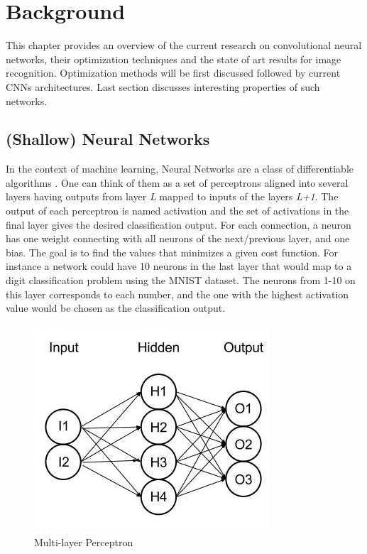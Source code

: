 \chapter{Background}

This chapter provides an overview of the current research on convolutional neural networks, their optimization techniques and the state of art results for image recognition. Optimization methods will be first discussed followed by current CNNs architectures. Last section discusses interesting properties of such networks.

\section{ (Shallow) Neural Networks}

In the context of machine learning, Neural Networks are a class of differentiable algorithms \cite{bishop1995neural}. One can think of them as a set of perceptrons aligned into several layers having outputs from layer \textit{L} mapped to inputs of the layers \textit{L+1}. The output of each perceptron is named activation and the set of activations in the final layer gives the desired classification output. For each connection, a neuron has one weight connecting with all neurons of the next/previous layer, and one bias. The goal is to find the values that minimizes a given cost function. For instance a network could have 10 neurons in the last layer that would map to a digit classification problem using the MNIST \cite{lecun1998mnist} dataset. The neurons from 1-10 on this layer corresponds to each number, and the one with the highest activation value would be chosen as the classification output.

\begin{figure}[h!]
	\centering
	\includegraphics[scale=0.5]{mlnet.png}
	\caption{Multi-layer Perceptron}
	\label{fig:mlnet}
\end{figure}



